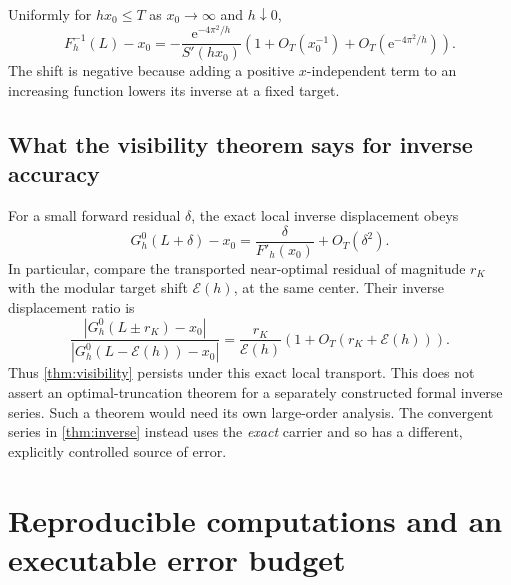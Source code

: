 \documentclass[11pt,a4paper]{article}
\theoremstyle{definition}
\theoremstyle{remark}
\newcommand{\e}{\mathrm e}
\newcommand{\Ecal}{\mathcal E}
\begin{document}
Uniformly for $hx_0\le T$ as $x_0\to\infty$ and $h\downarrow0$,
\begin{equation}
 F_h^{-1}(L)-x_0
 =-\frac{\e^{-4\pi^2/h}}{S'(hx_0)}
 \left(1+O_T(x_0^{-1})+O_T(\e^{-4\pi^2/h})\right).
 \label{eq:inverseleading}
\end{equation}
The shift is negative because adding a positive $x$-independent term to an
increasing function lowers its inverse at a fixed target.

\subsection{What the visibility theorem says for inverse accuracy}
For a small forward residual $\delta$, the exact local inverse displacement
obeys
\begin{equation}
 G_h^0(L+\delta)-x_0
 =\frac{\delta}{F'_h(x_0)}+O_T(\delta^2).
 \label{eq:residualtransport}
\end{equation}
In particular, compare the transported near-optimal residual of magnitude
$r_K$ with the modular target shift $\Ecal(h)$, at the same center. Their
inverse displacement ratio is
\begin{equation}
 \frac{|G_h^0(L\pm r_K)-x_0|}
 {|G_h^0(L-\Ecal(h))-x_0|}
 =\frac{r_K}{\Ecal(h)}\left(1+O_T(r_K+\Ecal(h))\right).
 \label{eq:inverseratio}
\end{equation}
Thus \cref{thm:visibility} persists under this exact local transport.
This does not assert an optimal-truncation theorem for a separately
constructed formal inverse series. Such a theorem would need its own
large-order analysis. The convergent series in \cref{thm:inverse} instead
uses the \emph{exact} carrier and so has a different, explicitly controlled
source of error.

\section{Reproducible computations and an executable error budget}
\label{sec:checks}
\end{document}
